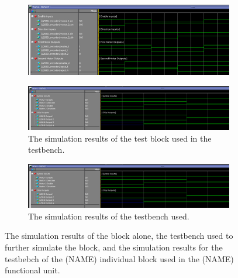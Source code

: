 \documentclass[a4paper]{article}
\begin{document}
\begin{figure}[h]
  \centering
  \begin{subfigure}[t]{.98\textwidth}
    \includegraphics[width=.98\textwidth]{sims/placeholder_sim.png}
  \end{subfigure}
  \begin{subfigure}[t]{.98\textwidth}
    \includegraphics[width=.98\textwidth]{sims/placeholder_testbench_sim.png}
    \caption{The simulation results of the test block used in the testbench.}
  \end{subfigure}
  \begin{subfigure}[t]{.98\textwidth}
    \includegraphics[width=.98\textwidth]{sims/placeholder_testbench_sim.png}
    \caption{The simulation results of the testbench used.}
  \end{subfigure}
    \caption{The simulation results of the block alone, the testbench used to further simulate the block, and the simulation results for the testbebch of the (NAME) individual block used in the (NAME) functional unit.}
    \label{fig:individual-1-1-sim}
\end{figure}



\clearpage
\end{document}
